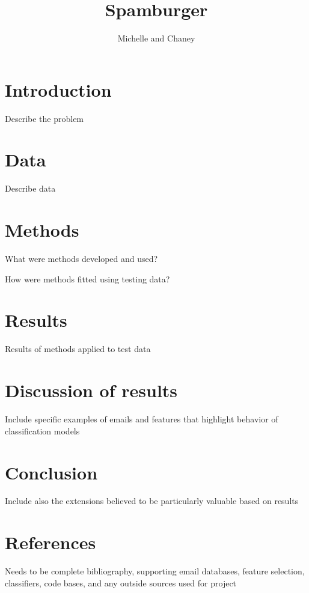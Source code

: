 \documentclass[10pt]{article}
\title{Spamburger}
\author{Michelle and Chaney}
\begin{document}
\maketitle


\section{Introduction}
Describe the problem



\section{Data}
Describe data

\section{Methods}
What were methods developed and used?

How were methods fitted using testing data?

\section{Results}
Results of methods applied to test data

\section{Discussion of results}
Include specific examples of emails and features that highlight behavior of classification models

\section{Conclusion}
Include also the extensions believed to be particularly valuable based on results

\section{References}
Needs to be complete bibliography, supporting email databases, feature selection, classifiers, code bases, and any outside sources used for project
\end{document}
